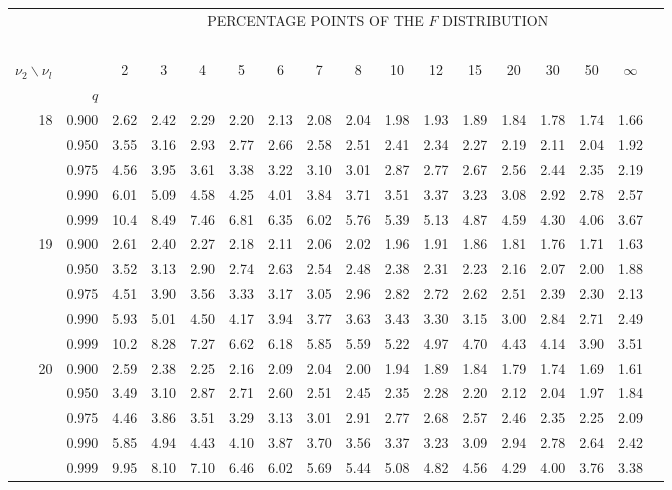 {\begin{center}
\begin{tabular}{rrr@{\,}r@{\,}r@{\,}r@{\,}r@{\,}r@{\,}r@{\,}r
                   @{\,}r@{\,}r@{\,}r@{\,}r@{\,}r@{\,}r@{\,}r}
&&\multicolumn{14}{c}{PERCENTAGE POINTS OF THE $F$ DISTRIBUTION}\\
\ \\
$\nu_2\backslash\nu_l$ & & 
\multicolumn{1}{c}{2} &\multicolumn{1}{c}{3} &
\multicolumn{1}{c}{4} &\multicolumn{1}{c}{5} &
\multicolumn{1}{c}{6} &\multicolumn{1}{c}{7} &
\multicolumn{1}{c}{8} &\multicolumn{1}{c}{10}&
\multicolumn{1}{c}{12}&\multicolumn{1}{c}{15}&
\multicolumn{1}{c}{20}&\multicolumn{1}{c}{30}&
\multicolumn{1}{c}{50}&\multicolumn{1}{c}{$\infty$}\\
& $q$ \\
18&0.900&2.62&2.42&2.29&2.20&2.13&2.08&2.04&1.98&1.93&1.89&1.84&1.78&1.74&1.66\\
  &0.950&3.55&3.16&2.93&2.77&2.66&2.58&2.51&2.41&2.34&2.27&2.19&2.11&2.04&1.92\\
  &0.975&4.56&3.95&3.61&3.38&3.22&3.10&3.01&2.87&2.77&2.67&2.56&2.44&2.35&2.19\\
  &0.990&6.01&5.09&4.58&4.25&4.01&3.84&3.71&3.51&3.37&3.23&3.08&2.92&2.78&2.57\\
  &0.999&10.4&8.49&7.46&6.81&6.35&6.02&5.76&5.39&5.13&4.87&4.59&4.30&4.06&3.67\\
19&0.900&2.61&2.40&2.27&2.18&2.11&2.06&2.02&1.96&1.91&1.86&1.81&1.76&1.71&1.63\\
  &0.950&3.52&3.13&2.90&2.74&2.63&2.54&2.48&2.38&2.31&2.23&2.16&2.07&2.00&1.88\\
  &0.975&4.51&3.90&3.56&3.33&3.17&3.05&2.96&2.82&2.72&2.62&2.51&2.39&2.30&2.13\\
  &0.990&5.93&5.01&4.50&4.17&3.94&3.77&3.63&3.43&3.30&3.15&3.00&2.84&2.71&2.49\\
  &0.999&10.2&8.28&7.27&6.62&6.18&5.85&5.59&5.22&4.97&4.70&4.43&4.14&3.90&3.51\\
20&0.900&2.59&2.38&2.25&2.16&2.09&2.04&2.00&1.94&1.89&1.84&1.79&1.74&1.69&1.61\\
  &0.950&3.49&3.10&2.87&2.71&2.60&2.51&2.45&2.35&2.28&2.20&2.12&2.04&1.97&1.84\\
  &0.975&4.46&3.86&3.51&3.29&3.13&3.01&2.91&2.77&2.68&2.57&2.46&2.35&2.25&2.09\\
  &0.990&5.85&4.94&4.43&4.10&3.87&3.70&3.56&3.37&3.23&3.09&2.94&2.78&2.64&2.42\\
  &0.999&9.95&8.10&7.10&6.46&6.02&5.69&5.44&5.08&4.82&4.56&4.29&4.00&3.76&3.38\\

\end{tabular}
\end{center}}
